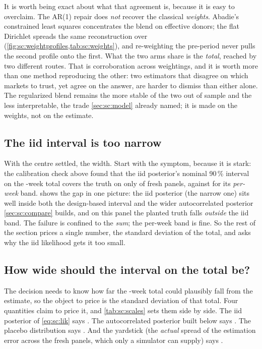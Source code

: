 It is worth being exact about what that agreement is, because it is easy to overclaim. The AR(1)
repair does \emph{not} recover the classical \emph{weights}. Abadie's constrained least squares
concentrates the blend on \nbSevenClEffDonors{} effective donors; the flat Dirichlet spreads the
same reconstruction over \nbSevenBayesEffDonors{} (\cref{fig:sc:weightprofiles,tab:sc:weights}), and
re-weighting the pre-period never pulls the second profile onto the first. What the two arms share
is the \emph{total}, reached by two different routes. That is corroboration across weightings, and
it is worth more than one method reproducing the other: two estimators that disagree on which markets
to trust, yet agree on the answer, are harder to dismiss than either alone. The regularized blend
remains the more stable of the two out of sample and the less interpretable, the trade
\cref{sec:sc:model} already named; it is made on the weights, not on the estimate.



\subsection*{The iid interval is too narrow}

With the centre settled, the width. Start with the symptom, because it is stark: the calibration
check above found that the iid posterior's nominal 90\,\% interval on the \nbSevenNPost-week total
covers the truth on only \pc{\nbSevenTotalCov} of fresh panels, against \pc{\nbSevenWeekCov} for its
\emph{per-week} band.  shows the gap in one picture: the iid posterior (the
narrow one) sits well inside both the design-based interval and the wider autocorrelated posterior
\cref{sec:sc:compare} builds, and on this panel the planted truth falls \emph{outside} the iid band. The
failure is confined to the \emph{sum}; the per-week band is fine. So the rest of the section prices a
single number, the standard deviation of the total, and asks why the iid likelihood gets it too small.



\subsection*{How wide should the interval on the total be?}

The decision needs to know how far the \nbSevenNPost-week total could plausibly fall from the
estimate, so the object to price is the standard deviation of that total. Four quantities claim to
price it, and \cref{tab:sc:scales} sets them side by side. The iid posterior of \cref{eq:sc:lik}
says \keur{\nbSevenIidSd}. The autocorrelated posterior built below says \keur{\nbSevenBayesSd}. The
placebo distribution says \keur{\nbSevenPlaceboSd}. And the yardstick (the \emph{actual} spread
of the estimation error across the \nbSevenNPanels{} fresh panels, which only a simulator can
supply) says \keur{\nbSevenSeedSd}.

